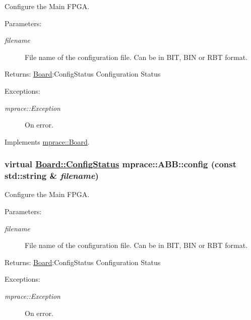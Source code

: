 Configure the Main FPGA. 

\begin{Desc}
\item[Parameters:]
\begin{description}
\item[{\em filename}]File name of the configuration file. Can be in BIT, BIN or RBT format. \end{description}
\end{Desc}
\begin{Desc}
\item[Returns:]\hyperlink{classmprace_1_1Board}{Board}:Config\-Status Configuration Status \end{Desc}
\begin{Desc}
\item[Exceptions:]
\begin{description}
\item[{\em mprace::Exception}]On error.\end{description}
\end{Desc}


Implements \hyperlink{classmprace_1_1Board_a14}{mprace::Board}.\hypertarget{classmprace_1_1ABB_a12}{
\subsubsection[config]{\setlength{\rightskip}{0pt plus 5cm}virtual \hyperlink{classmprace_1_1Board_w4}{Board::Config\-Status} mprace::ABB::config (const std::string \& {\em filename})}}
\label{classmprace_1_1ABB_a12}


Configure the Main FPGA. 

\begin{Desc}
\item[Parameters:]
\begin{description}
\item[{\em filename}]File name of the configuration file. Can be in BIT, BIN or RBT format. \end{description}
\end{Desc}
\begin{Desc}
\item[Returns:]\hyperlink{classmprace_1_1Board}{Board}:Config\-Status Configuration Status \end{Desc}
\begin{Desc}
\item[Exceptions:]
\begin{description}
\item[{\em mprace::Exception}]On error.\end{description}
\end{Desc}


